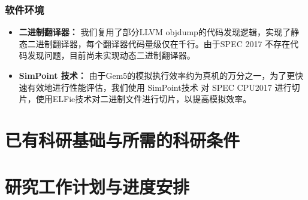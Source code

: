 \documentclass{Style/ucasproposal}%
\begin{document}
\subsubsection{软件环境}

\begin{itemize}
  \item \textbf{二进制翻译器：} 我们复用了部分LLVM objdump的代码发现逻辑，实现了静态二进制翻译器，每个翻译器代码量级仅在千行。由于SPEC 2017 不存在代码发现问题，目前尚未实现动态二进制翻译器。

  \item \textbf{SimPoint 技术：} 由于Gem5的模拟执行效率约为真机的万分之一，为了更快速有效地进行性能评估，我们使用 SimPoint技术\cite{sherwoodAutomaticallyCharacterizingLarge2002} 对 SPEC CPU2017 进行切片，使用ELFie技术\cite{patilELFiesExecutableRegion2021}对二进制文件进行切片，以提高模拟效率。
\end{itemize}



\section{已有科研基础与所需的科研条件}



\section{研究工作计划与进度安排}





\end{document}

